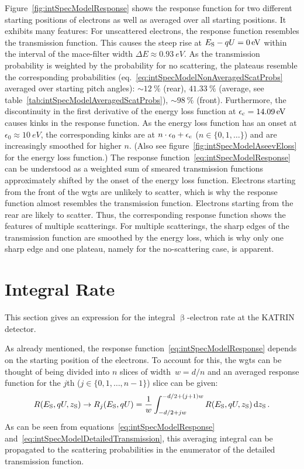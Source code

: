 Figure~\ref{fig:intSpecModelResponse} shows the response function for two different starting positions of electrons as well as averaged over all starting positions. It exhibits many features: For unscattered electrons, the response function resembles the transmission function. This causes the steep rise at $E_\mathrm{S}-qU=\SI{0}{eV}$ within the interval of the \gls{mace}-filter width $\Delta E\approx\SI{0.93}{eV}$. As the transmission probability is weighted by the probability for no scattering, the plateaus resemble the corresponding probabilities (eq.~\ref{eq:intSpecModelNonAveragedScatProbs} averaged over starting pitch angles): $\sim\SI{12}{\percent}$ (rear), $\SI{41.33}{\percent}$ (average, see table~\ref{tab:intSpecModelAveragedScatProbs}), $\sim\SI{98}{\percent}$ (front).
Furthermore, the discontinuity in the first derivative of the energy loss function at $\epsilon_\mathrm{c}=\SI{14.09}{eV}$ causes kinks in the response function. As the energy loss function has an onset at $\epsilon_0\approx\SI{10}{eV}$, the corresponding kinks are at $n\cdot\epsilon_0+\epsilon_\mathrm{c}$ ($n\in\{0,1,\dots\}$) and are increasingly smoothed for higher $n$. (Also see figure~\ref{fig:intSpecModelAseevEloss} for the energy loss function.) 
The response function~\eqref{eq:intSpecModelResponse} can be understood as a weighted sum of smeared transmission functions approximately shifted by the onset of the energy loss function. Electrons starting from the front of the \gls{wgts} are unlikely to scatter, which is why the response function almost resembles the transmission function. Electrons starting from the rear are likely to scatter. Thus, the corresponding response function shows the features of multiple scatterings. For multiple scatterings, the sharp edges of the transmission function are smoothed by the energy loss, which is why only one sharp edge and one plateau, namely for the no-scattering case, is apparent.

\section{Integral Rate}
\label{sec:intSpecModelIntegralRate}
This section gives an expression for the integral $\upbeta$-electron rate at the KATRIN detector. 

As already mentioned, the response function~\eqref{eq:intSpecModelResponse} depends on the starting position of the electrons. To account for this, the \gls{wgts} can be thought of being divided into $n$ slices of width~$w=d/n$ and an averaged response function for the $j$th ($j\in\{0,1,\dots,n-1\}$) slice can be given:
\begin{equation}
	R(E_\mathrm{S},qU,z_\mathrm{S}) \rightarrow
	R_j(E_\mathrm{S},qU) =
	\frac{1}{w}
	\int_{-d/2+jw}^{-d/2+(j+1)w}
		R(E_\mathrm{S},qU,z_\mathrm{S})
	\mathop{}\!\mathrm{d} z_\mathrm{S}
	\text{\,.}
\end{equation}
As can be seen from equations~\eqref{eq:intSpecModelResponse} and~\eqref{eq:intSpecModelDetailedTransmission}, this averaging integral can be propagated to the scattering probabilities in the enumerator of the detailed transmission function.

